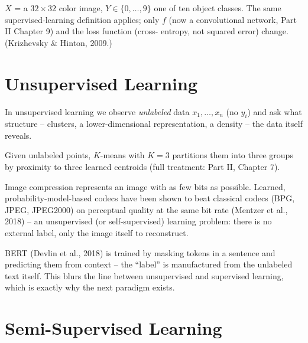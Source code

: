 \documentclass[11pt]{article}
\begin{document}
\begin{example}
$X$ = a $32\times32$ color image, $Y \in \{0,\dots,9\}$ one of ten object
classes. The same supervised-learning definition applies; only $f$ (now a
convolutional network, Part II Chapter 9) and the loss function (cross-
entropy, not squared error) change. (Krizhevsky \& Hinton, 2009.)
\end{example}

\section{Unsupervised Learning}

\begin{definition}
In unsupervised learning we observe \emph{unlabeled} data $x_1,\dots,x_n$
(no $y_i$) and ask what structure -- clusters, a lower-dimensional
representation, a density -- the data itself reveals.
\end{definition}

\begin{example}[Clustering]
Given unlabeled points, $K$-means with $K=3$ partitions them into three
groups by proximity to three learned centroids (full treatment: Part II,
Chapter 7).
\end{example}

\begin{example}
Image compression represents an image with as few bits as possible.
Learned, probability-model-based codecs have been shown to beat classical
codecs (BPG, JPEG, JPEG2000) on perceptual quality at the same bit rate
(Mentzer et al., 2018) -- an unsupervised (or self-supervised) learning
problem: there is no external label, only the image itself to reconstruct.
\end{example}

\begin{example}
BERT (Devlin et al., 2018) is trained by masking tokens in a sentence and
predicting them from context -- the ``label'' is manufactured from the
unlabeled text itself. This blurs the line between unsupervised and
supervised learning, which is exactly why the next paradigm exists.
\end{example}

\section{Semi-Supervised Learning}
\end{document}
